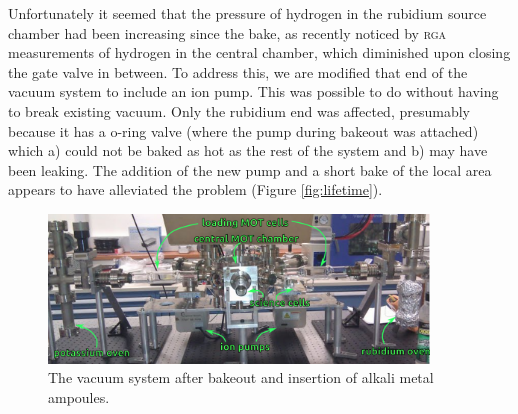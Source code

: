 Unfortunately it seemed that the pressure of hydrogen in the rubidium source chamber had been increasing since the bake, as recently noticed by \textsc{rga} measurements of hydrogen in the central chamber, which diminished upon closing the gate valve in between. To address this, we are modified that end of the vacuum system to include an ion pump. This was possible to do without having to break existing vacuum. Only the rubidium end was affected, presumably because it has a o-ring valve (where the pump during bakeout was attached) which a) could not be baked as hot as the rest of the system and b) may have been leaking. The addition of the new pump and a short bake of the local area appears to have alleviated the problem (Figure \ref{fig:lifetime}).

\begin{figure}
\begin{center}
\includegraphics[width=0.9\textwidth]{figures/unsorted/vacsystem.png}
\caption{\label{fig:vacsystem}The vacuum system after bakeout and insertion of alkali metal ampoules.}
\end{center}
\end{figure}

